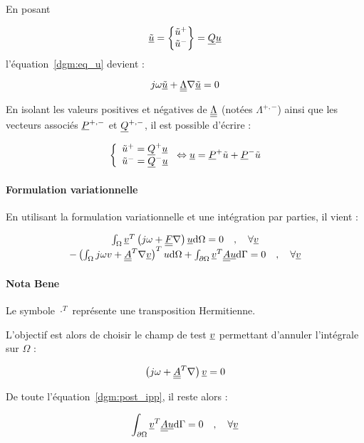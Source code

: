 En posant

\begin{equation}
    \underline{\tilde{u}} = \begin{Bmatrix}\tilde{u}^+\\\tilde{u}^-\end{Bmatrix} = \underline{Q}\underline{u}\label{dgm:utilde}
\end{equation}
l'équation~\eqref{dgm:eq_u} devient :

\begin{equation*}
    j\omega \underline{\tilde{u}} + \underline{\underline{\Lambda}}\nabla\underline{\tilde{u}} = 0
\end{equation*}

En isolant les valeurs positives et négatives de $\underline{\underline{\Lambda}}$  (notées $\Lambda^{+,-}$) ainsi que les vecteurs
associés $\underline{P}^{+,-}$ et $\underline{Q}^{+,-}$, il est possible d'écrire :

\begin{equation}
    \left\{\begin{array}{l}
        \tilde{u}^+ = \underline{Q}^+\underline{u}\\
        \tilde{u}^- = \underline{Q}^-\underline{u}
    \end{array}\right. \Leftrightarrow
    \underline{u} = \underline{P}^+\tilde{u} + \underline{P}^-\tilde{u} \label{dgm:sep_u}
\end{equation}


\paragraph{Formulation variationnelle}

En utilisant la formulation variationnelle et une intégration par parties, il vient :

\begin{equation}
    \begin{array}{c}
    \int_\Omega \underline{v}^T\left(j\omega + \underline{\underline{F}}\nabla\right)\underline{u}\mathrm{d}\Omega = 0 \quad,\quad \forall\underline{v}\\
    -\left(\int_\Omega j\omega v + \underline{\underline{A}}^T\nabla\underline{v}\right)^Tu\mathrm{d}\Omega +
        \int_{\partial\Omega}\underline{v}^T\underline{\underline{A}}\underline{u}\mathrm{d}\Gamma = 0 \quad,\quad \forall\underline{v}
    \end{array}
    \label{dgm:post_ipp}
\end{equation}

\paragraph{Nota Bene} Le symbole $\cdot^T$ représente une transposition Hermitienne.

L'objectif est alors de choisir le champ de test $\underline{v}$ permettant d'annuler l'intégrale sur $\Omega$ :

\begin{equation}
    \left(j\omega + \underline{\underline{A}}^T\nabla\right)\underline{v} = 0 \label{dgm:eq_v}
\end{equation}

De toute l'équation~\eqref{dgm:post_ipp}, il reste alors :

\begin{equation}
    \int_{\partial\Omega}\underline{v}^T\underline{\underline{A}}\underline{u}\mathrm{d}\Gamma = 0 \quad,\quad \forall\underline{v}\label{dgm:to_solve}
\end{equation}

